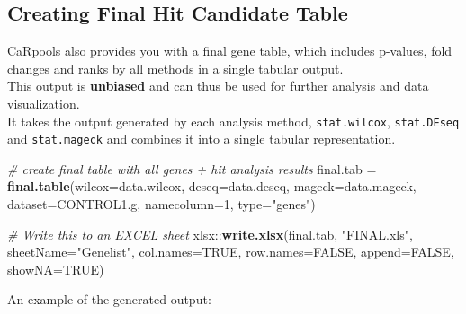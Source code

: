 \documentclass[]{article}
\newenvironment{Shaded}{\begin{snugshade}}{\end{snugshade}}
\newcommand{\KeywordTok}[1]{\textcolor[rgb]{0.13,0.29,0.53}{\textbf{{#1}}}}
\newcommand{\DataTypeTok}[1]{\textcolor[rgb]{0.13,0.29,0.53}{{#1}}}
\newcommand{\DecValTok}[1]{\textcolor[rgb]{0.00,0.00,0.81}{{#1}}}
\newcommand{\StringTok}[1]{\textcolor[rgb]{0.31,0.60,0.02}{{#1}}}
\newcommand{\CommentTok}[1]{\textcolor[rgb]{0.56,0.35,0.01}{\textit{{#1}}}}
\newcommand{\OtherTok}[1]{\textcolor[rgb]{0.56,0.35,0.01}{{#1}}}
\newcommand{\NormalTok}[1]{{#1}}
\begin{document}
\newpage

\subsection{Creating Final Hit Candidate
Table}\label{creating-final-hit-candidate-table}

CaRpools also provides you with a final gene table, which includes
p-values, fold changes and ranks by all methods in a single tabular
output.\\
This output is \textbf{unbiased} and can thus be used for further
analysis and data visualization.\\
It takes the output generated by each analysis method,
\texttt{stat.wilcox}, \texttt{stat.DEseq} and \texttt{stat.mageck} and
combines it into a single tabular representation.

\begin{Shaded}
\begin{Highlighting}[]
\CommentTok{# create final table with all genes + hit analysis results}
\NormalTok{final.tab =}\StringTok{ }\KeywordTok{final.table}\NormalTok{(}\DataTypeTok{wilcox=}\NormalTok{data.wilcox, }\DataTypeTok{deseq=}\NormalTok{data.deseq, }\DataTypeTok{mageck=}\NormalTok{data.mageck, }\DataTypeTok{dataset=}\NormalTok{CONTROL1.g, }\DataTypeTok{namecolumn=}\DecValTok{1}\NormalTok{, }\DataTypeTok{type=}\StringTok{"genes"}\NormalTok{)}

\CommentTok{# Write this to an EXCEL sheet}
\NormalTok{xlsx::}\KeywordTok{write.xlsx}\NormalTok{(final.tab, }\StringTok{"FINAL.xls"}\NormalTok{, }\DataTypeTok{sheetName=}\StringTok{"Genelist"}\NormalTok{, }
  \DataTypeTok{col.names=}\OtherTok{TRUE}\NormalTok{, }\DataTypeTok{row.names=}\OtherTok{FALSE}\NormalTok{, }\DataTypeTok{append=}\OtherTok{FALSE}\NormalTok{, }\DataTypeTok{showNA=}\OtherTok{TRUE}\NormalTok{)}
\end{Highlighting}
\end{Shaded}

An example of the generated output:
\end{document}
